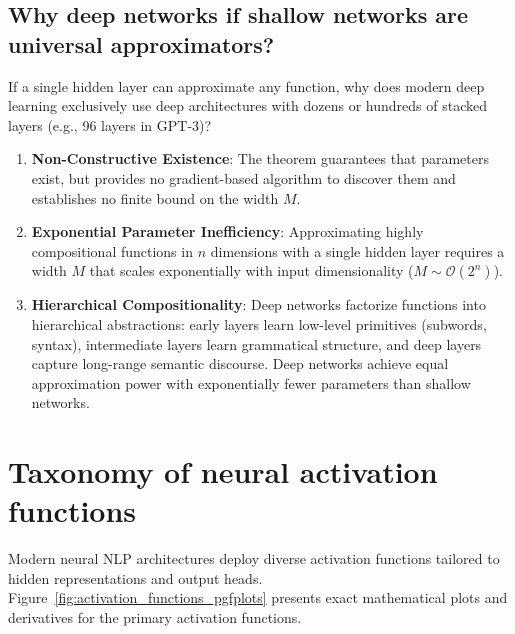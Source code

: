 \documentclass[../../main.tex]{subfiles}
\begin{document}
\subsection{Why deep networks if shallow networks are universal approximators?}
If a single hidden layer can approximate any function, why does modern deep learning exclusively use deep architectures with dozens or hundreds of stacked layers (e.g., 96 layers in GPT-3)?
\begin{enumerate}
    \item \textbf{Non-Constructive Existence}: The theorem guarantees that parameters exist, but provides no gradient-based algorithm to discover them and establishes no finite bound on the width $M$.
    \item \textbf{Exponential Parameter Inefficiency}: Approximating highly compositional functions in $n$ dimensions with a single hidden layer requires a width $M$ that scales exponentially with input dimensionality ($M \sim \mathcal{O}(2^n)$).
    \item \textbf{Hierarchical Compositionality}: Deep networks factorize functions into hierarchical abstractions: early layers learn low-level primitives (subwords, syntax), intermediate layers learn grammatical structure, and deep layers capture long-range semantic discourse. Deep networks achieve equal approximation power with exponentially fewer parameters than shallow networks.
\end{enumerate}


\section{Taxonomy of neural activation functions}
\label{sec:activations_taxonomy}

Modern neural NLP architectures deploy diverse activation functions tailored to hidden representations and output heads. Figure~\ref{fig:activation_functions_pgfplots} presents exact mathematical plots and derivatives for the primary activation functions.
\end{document}
